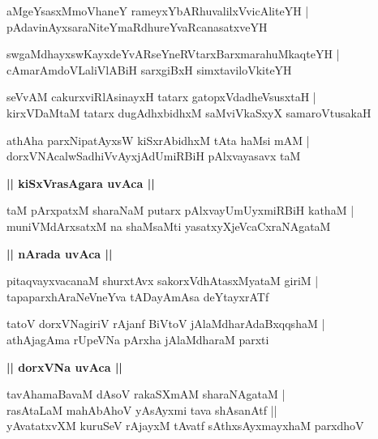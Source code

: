 \documentclass[twoside,12pt,openright]{book}
\newcounter{shloka}[chapter]
\def\uvaca#1{\centerline{{\large\textbf{#1}}}}
\begin{document}
\begin{shloka}%
aMgeYsasxMmoVhaneY rameyxYbARhuvalilxVvicAliteYH |\\
pAdavinAyxsaraNiteYmaRdhureYvaRcanasatxveYH
\end{shloka}

\begin{shloka}%
swgaMdhayxswKayxdeYvARseYneRVtarxBarxmarahuMkaqteYH |\\
cAmarAmdoVLaliVlABiH sarxgiBxH simxtaviloVkiteYH
\end{shloka}

\begin{shloka}%
seVvAM cakurxviRlAsinayxH tatarx gatopxVdadheVsusxtaH |\\
kirxVDaMtaM tatarx dugAdhxbidhxM saMviVkaSxyX samaroVtusakaH 
\end{shloka}

\begin{shloka}%
athAha parxNipatAyxsW kiSxrAbidhxM tAta haMsi mAM |\\
dorxVNAcalwSadhiVvAyxjAdUmiRBiH pAlxvayasavx taM 
\end{shloka}

\uvaca{|| kiSxVrasAgara uvAca ||}

\begin{shloka}%
taM pArxpatxM sharaNaM putarx pAlxvayUmUyxmiRBiH kathaM |\\
muniVMdArxsatxM na shaMsaMti yasatxyXjeVcaCxraNAgataM 
\end{shloka}

\uvaca{|| nArada uvAca ||}

\begin{shloka}%
pitaqvayxvacanaM shurxtAvx sakorxVdhAtasxMyataM giriM |\\
tapaparxhAraNeVneYva tADayAmAsa deYtayxrATf
\end{shloka}

\begin{shloka}%
tatoV dorxVNagiriV rAjanf BiVtoV jAlaMdharAdaBxqqshaM |\\
athAjagAma rUpeVNa pArxha jAlaMdharaM parxti
\end{shloka}

\uvaca{|| dorxVNa uvAca ||}

\begin{shloka}%
tavAhamaBavaM dAsoV rakaSXmAM sharaNAgataM |\\
rasAtaLaM mahAbAhoV yAsAyxmi tava shAsanAtf ||\\
yAvatatxvXM kuruSeV rAjayxM tAvatf sAthxsAyxmayxhaM parxdhoV
\end{shloka}
\end{document}
